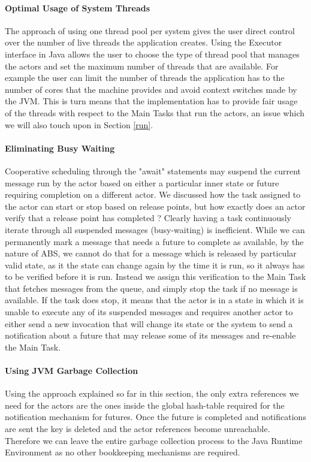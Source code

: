 \paragraph{Optimal Usage of System Threads}
The approach of using one thread pool per system gives the user direct control over the number of live threads the application creates. Using the Executor interface in Java allows the user to choose the type of thread pool that manages the actors and set the maximum number of threads that are available. For example the user can limit the number of threads the application has to the number of cores that the machine provides and avoid context switches made by the JVM. This is turn means that the implementation has to provide fair usage of the threads with respect to the Main Tasks that run the actors, an issue which we will also touch upon in Section \ref{run}.  

\paragraph{Eliminating Busy Waiting}
Cooperative scheduling through the "await" statements may suspend the current message run by the actor based on either a particular inner state or future requiring completion on a different actor. We discussed how the task assigned to the actor can start or stop based on release points, but how exactly does an actor verify that a release point has completed ? Clearly having a task continuously iterate through all suspended messages (busy-waiting) is inefficient. While we can permanently mark a message that needs a future to complete as available, by the nature of ABS, we cannot do that for a message which is released by particular valid state, as it the state can change again by the time it is run, so it always has to be verified before it is run. Instead we assign this verification to the Main Task that fetches messages from the queue, and simply stop the task if no message is available. If the task does stop, it means that the actor is in a state in which it is unable to execute any of its suspended messages and requires another actor to either send a new invocation that will change its state or the system to send a notification about a future that may release some of its messages and re-enable the Main Task.  


\paragraph{Using JVM Garbage Collection}
Using the approach explained so far in this section, the only extra references we need for the actors are the ones inside the global hash-table required for the notification mechanism for futures. Once the future is completed and notifications are sent the key is deleted and the actor references become unreachable. Therefore we can leave the entire garbage collection process to the Java Runtime Environment as no other bookkeeping mechanisms are required.

